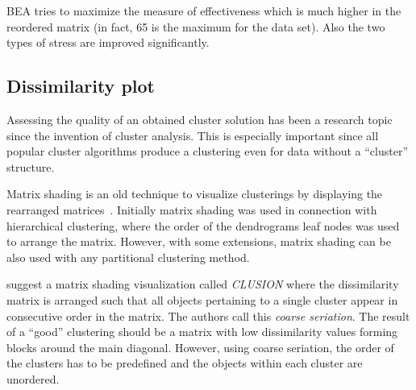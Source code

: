 \documentclass[fleqn, a4paper]{article}
\begin{document}
BEA tries to maximize the measure of effectiveness which is
much higher in the reordered matrix (in fact, 65 is the maximum for 
the data set). Also the two types of stress are improved
significantly.

\subsection{Dissimilarity plot}

Assessing the quality of an obtained cluster solution has been a
research topic since the invention of cluster analysis. This is
especially important since all popular cluster algorithms produce a
clustering even for data without a ``cluster'' structure.

%
%

Matrix shading is an old technique to visualize clusterings by displaying the
rearranged matrices~\citep[see,
e.g.,][]{seriation:Sneath:1973,seriation:Ling:1973,seriation:Gale:1984}.
Initially matrix shading was used in connection with hierarchical clustering,
where the order of the dendrograms leaf nodes was used to arrange the matrix.
However, with some extensions, matrix shading can be also used with any
partitional clustering method. 

\cite{seriation:Strehl:2003} suggest a matrix shading visualization called
\emph{CLUSION} where the dissimilarity matrix is arranged such that all objects
pertaining to a single cluster appear in consecutive order in the matrix. The
authors call this \emph{coarse seriation}. The result of a ``good'' clustering
should be a matrix with low dissimilarity values forming blocks around the main
diagonal.  However, using coarse seriation, the order of the clusters has to be
predefined and the objects within each cluster are unordered.
\end{document}

